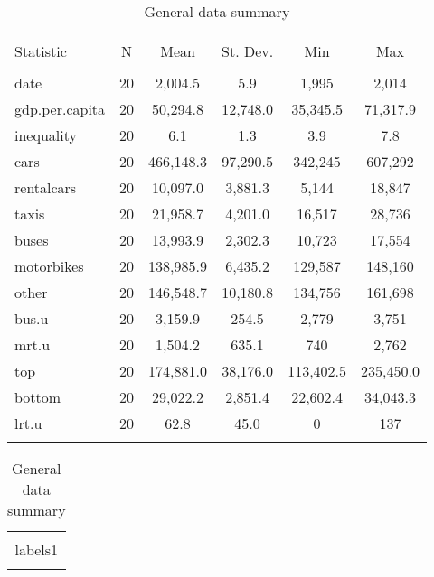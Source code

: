 
\begin{table}[!htbp] \centering 
  \caption{General data summary} 
  \label{} 
\begin{tabular}{@{\extracolsep{5pt}}lccccc} 
\\[-1.8ex]\hline 
\hline \\[-1.8ex] 
Statistic & \multicolumn{1}{c}{N} & \multicolumn{1}{c}{Mean} & \multicolumn{1}{c}{St. Dev.} & \multicolumn{1}{c}{Min} & \multicolumn{1}{c}{Max} \\ 
\hline \\[-1.8ex] 
date & 20 & 2,004.5 & 5.9 & 1,995 & 2,014 \\ 
gdp.per.capita & 20 & 50,294.8 & 12,748.0 & 35,345.5 & 71,317.9 \\ 
inequality & 20 & 6.1 & 1.3 & 3.9 & 7.8 \\ 
cars & 20 & 466,148.3 & 97,290.5 & 342,245 & 607,292 \\ 
rentalcars & 20 & 10,097.0 & 3,881.3 & 5,144 & 18,847 \\ 
taxis & 20 & 21,958.7 & 4,201.0 & 16,517 & 28,736 \\ 
buses & 20 & 13,993.9 & 2,302.3 & 10,723 & 17,554 \\ 
motorbikes & 20 & 138,985.9 & 6,435.2 & 129,587 & 148,160 \\ 
other & 20 & 146,548.7 & 10,180.8 & 134,756 & 161,698 \\ 
bus.u & 20 & 3,159.9 & 254.5 & 2,779 & 3,751 \\ 
mrt.u & 20 & 1,504.2 & 635.1 & 740 & 2,762 \\ 
top & 20 & 174,881.0 & 38,176.0 & 113,402.5 & 235,450.0 \\ 
bottom & 20 & 29,022.2 & 2,851.4 & 22,602.4 & 34,043.3 \\ 
lrt.u & 20 & 62.8 & 45.0 & 0 & 137 \\ 
\hline \\[-1.8ex] 
\end{tabular} 
\end{table} 

\begin{table}[!htbp] \centering 
  \caption{General data summary} 
  \label{} 
\begin{tabular}{@{\extracolsep{5pt}} c} 
\\[-1.8ex]\hline 
\hline \\[-1.8ex] 
labels1 \\ 
\hline \\[-1.8ex] 
\end{tabular} 
\end{table} 
